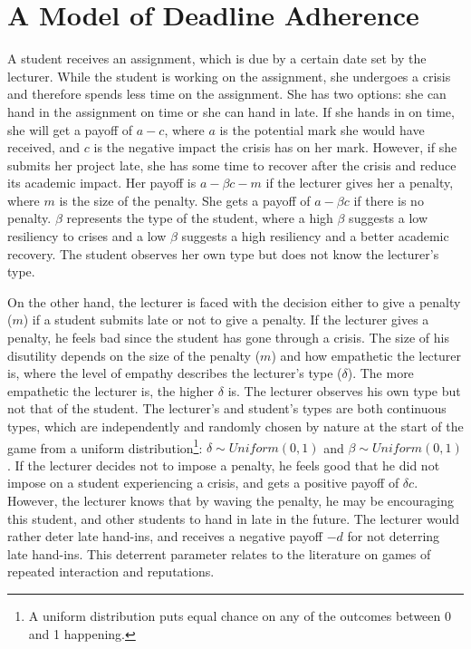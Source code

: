 \documentclass[11pt,preprint, authoryear]{elsarticle}
\numberwithin{equation}{section}
\numberwithin{figure}{section}
\numberwithin{table}{section}
\let\rmarkdownfootnote\footnote%
\def\footnote{\protect\rmarkdownfootnote}
\begin{document}
\hypertarget{a-model-of-deadline-adherence}{%
\section{\texorpdfstring{A Model of Deadline Adherence
\label{game}}{A Model of Deadline Adherence }}\label{a-model-of-deadline-adherence}}

A student receives an assignment, which is due by a certain date set by
the lecturer. While the student is working on the assignment, she
undergoes a crisis and therefore spends less time on the assignment. She
has two options: she can hand in the assignment on time or she can hand
in late. If she hands in on time, she will get a payoff of \(a-c\),
where \(a\) is the potential mark she would have received, and \(c\) is
the negative impact the crisis has on her mark. However, if she submits
her project late, she has some time to recover after the crisis and
reduce its academic impact. Her payoff is \(a-\beta c -m\) if the
lecturer gives her a penalty, where \(m\) is the size of the penalty.
She gets a payoff of \(a-\beta c\) if there is no penalty. \(\beta\)
represents the type of the student, where a high \(\beta\) suggests a
low resiliency to crises and a low \(\beta\) suggests a high resiliency
and a better academic recovery. The student observes her own type but
does not know the lecturer's type.

On the other hand, the lecturer is faced with the decision either to
give a penalty (\(m\)) if a student submits late or not to give a
penalty. If the lecturer gives a penalty, he feels bad since the student
has gone through a crisis. The size of his disutility depends on the
size of the penalty (\(m\)) and how empathetic the lecturer is, where
the level of empathy describes the lecturer's type (\(\delta\)). The
more empathetic the lecturer is, the higher \(\delta\) is. The lecturer
observes his own type but not that of the student. The lecturer's and
student's types are both continuous types, which are independently and
randomly chosen by nature at the start of the game from a uniform
distribution\footnote{A uniform distribution puts equal chance on any of
  the outcomes between 0 and 1 happening.}: \(\delta \sim Uniform(0,1)\)
and \(\beta \sim Uniform(0,1)\). If the lecturer decides not to impose a
penalty, he feels good that he did not impose on a student experiencing
a crisis, and gets a positive payoff of \(\delta c\). However, the
lecturer knows that by waving the penalty, he may be encouraging this
student, and other students to hand in late in the future. The lecturer
would rather deter late hand-ins, and receives a negative payoff \(-d\)
for not deterring late hand-ins. This deterrent parameter relates to the
literature on games of repeated interaction and reputations.
\end{document}
